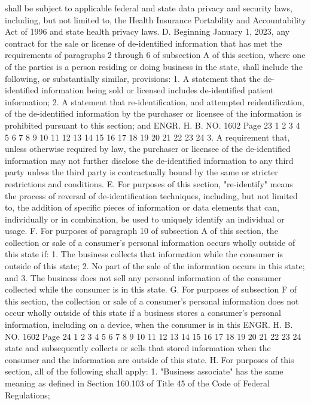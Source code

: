 shall be subject to applicable federal and state data privacy and
security laws, including, but not limited to, the Health Insurance
Portability and Accountability Act of 1996 and state health privacy
laws.
D. Beginning January 1, 2023, any contract for the sale or
license of de-identified information that has met the requirements
of paragraphs 2 through 6 of subsection A of this section, where one
of the parties is a person residing or doing business in the state,
shall include the following, or substantially similar, provisions:
1. A statement that the de-identified information being sold or
licensed includes de-identified patient information;
2. A statement that re-identification, and attempted reidentification, of the de-identified information by the purchaser or
licensee of the information is prohibited pursuant to this section;
and
ENGR. H. B. NO. 1602 Page 23
1
2
3
4
5
6
7
8
9
10
11
12
13
14
15
16
17
18
19
20
21
22
23
24
3. A requirement that, unless otherwise required by law, the
purchaser or licensee of the de-identified information may not
further disclose the de-identified information to any third party
unless the third party is contractually bound by the same or
stricter restrictions and conditions.
E. For purposes of this section, "re-identify" means the
process of reversal of de-identification techniques, including, but
not limited to, the addition of specific pieces of information or
data elements that can, individually or in combination, be used to
uniquely identify an individual or usage.
F. For purposes of paragraph 10 of subsection A of this
section, the collection or sale of a consumer's personal information
occurs wholly outside of this state if:
1. The business collects that information while the consumer is
outside of this state;
2. No part of the sale of the information occurs in this state;
and
3. The business does not sell any personal information of the
consumer collected while the consumer is in this state.
G. For purposes of subsection F of this section, the collection
or sale of a consumer's personal information does not occur wholly
outside of this state if a business stores a consumer's personal
information, including on a device, when the consumer is in this 
ENGR. H. B. NO. 1602 Page 24
1
2
3
4
5
6
7
8
9
10
11
12
13
14
15
16
17
18
19
20
21
22
23
24
state and subsequently collects or sells that stored information
when the consumer and the information are outside of this state.
H. For purposes of this section, all of the following shall
apply:
1. "Business associate" has the same meaning as defined in
Section 160.103 of Title 45 of the Code of Federal Regulations;

